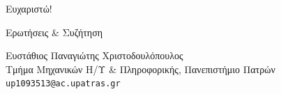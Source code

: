 \begin{frame}[standout]
  \Huge Ευχαριστώ!

  \vspace{0.6cm}
  \normalsize Ερωτήσεις \& Συζήτηση

  \vspace{0.8cm}
  \footnotesize
  Ευστάθιος Παναγιώτης Χριστοδουλόπουλος\\
  Τμήμα Μηχανικών Η/Υ \& Πληροφορικής, Πανεπιστήμιο Πατρών\\
  \texttt{up1093513@ac.upatras.gr}
\end{frame}

